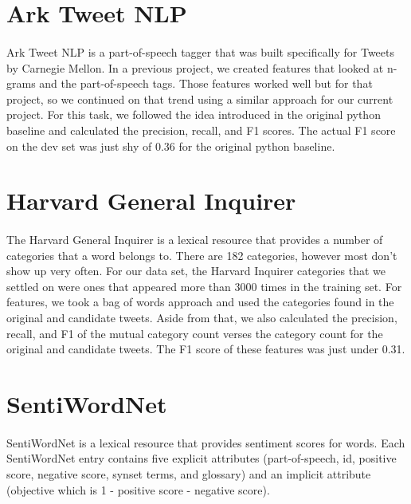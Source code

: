 \documentclass[11pt,letterpaper]{article}
\begin{document}
\section{Ark Tweet NLP}
\paragraph{}
Ark Tweet NLP is a part-of-speech tagger that was built specifically for Tweets by Carnegie Mellon. In a previous project, we created features that looked at n-grams and the part-of-speech tags. Those features worked well but for that project, so we continued on that trend using a similar approach for our current project. For this task, we followed the idea introduced in the original python baseline and calculated the precision, recall, and F1 scores. The actual F1 score on the dev set was just shy of 0.36 for the original python baseline.

\section{Harvard General Inquirer}
\paragraph{}
The Harvard General Inquirer is a lexical resource that provides a number of categories that a word belongs to. There are 182 categories, however most don't show up very often. For our data set, the Harvard Inquirer categories that we settled on were ones that appeared more than 3000 times in the training set. For features, we took a bag of words approach and used the categories found in the original and candidate tweets. Aside from that, we also calculated the precision, recall, and F1 of the mutual category count verses the category count for the original and candidate tweets. The F1 score of these features was just under 0.31.

\section{SentiWordNet}
\paragraph{}
SentiWordNet is a lexical resource that provides sentiment scores for words. Each SentiWordNet entry contains five explicit attributes (part-of-speech, id, positive score, negative score, synset terms, and glossary) and an implicit attribute (objective which is 1 - positive score - negative score). 
\end{document}
